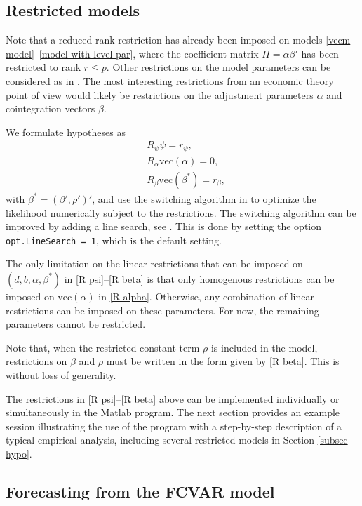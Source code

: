 \documentclass[article]{jss}
\begin{document}
\subsection{Restricted models}
\label{restricted models}

Note that a reduced rank restriction has already been imposed on models \eqref{vecm model}--\eqref{model with level par}, where the coefficient matrix $\Pi  = \alpha \beta '$ has been restricted to rank $r \leq p$. Other restrictions on the model parameters can be considered as in \cite{Johansen1995}. The most interesting restrictions from an economic theory point of view would likely be restrictions on the adjustment parameters $\alpha$ and cointegration vectors $\beta$.

We formulate hypotheses as
\begin{align}
  &R_{\psi} \psi = r_{\psi}, \label{R psi} \\
  &R_\alpha \mathrm{vec}(\alpha) = 0, \label{R alpha} \\
  &R_\beta \mathrm{vec}(\beta^{\ast}) = r_\beta, \label{R beta}
\end{align}
with $\beta^{\ast} = (\beta', \rho')'$, and use the switching algorithm in \cite[p.\ 455]{Boswijk2004} to optimize the likelihood numerically subject to the restrictions. The switching algorithm can be improved by adding a line search, see \cite{Doornik2016}. This is done by setting the option \verb|opt.LineSearch = 1|, which is the default setting.

The only limitation on the linear restrictions that can be imposed on $(d,b,\alpha,\beta^{\ast})$ in \eqref{R psi}--\eqref{R beta} is that only homogenous restrictions can be imposed on $\mathrm{vec}(\alpha)$ in \eqref{R alpha}. Otherwise, any combination of linear restrictions can be imposed on these parameters. For now, the remaining parameters cannot be restricted.

Note that, when the restricted constant term $\rho$ is included in the model, restrictions on $\beta$ and $\rho$ must be written in the form given by \eqref{R beta}. This is without loss of generality.

The restrictions in \eqref{R psi}--\eqref{R beta} above can be implemented individually or simultaneously in the Matlab program. The next section provides an example session illustrating the use of the program with a step-by-step description of a typical empirical analysis, including several restricted models in Section \ref{subsec hypo}.

\subsection{Forecasting from the FCVAR model}
\end{document}
